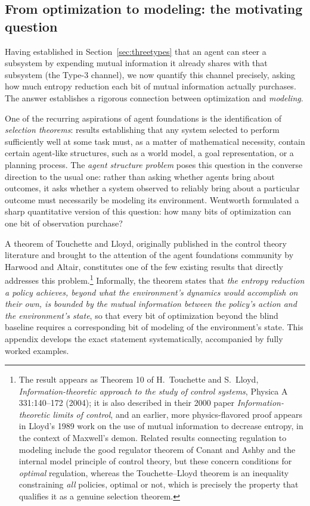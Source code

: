 \documentclass[10pt]{article}
\theoremstyle{definition}
\theoremstyle{remark}
\begin{document}
\subsection{From optimization to modeling: the motivating question}
\label{sec:tlquestion}

Having established in Section~\ref{sec:threetypes} that an agent can steer a subsystem by expending mutual information it already shares with that subsystem (the Type-3 channel), we now quantify this channel precisely, asking how much entropy reduction each bit of mutual information actually purchases. The answer establishes a rigorous connection between optimization and \emph{modeling}.

One of the recurring aspirations of agent foundations is the identification of \emph{selection theorems}: results establishing that any system selected to perform sufficiently well at some task must, as a matter of mathematical necessity, contain certain agent-like structures, such as a world model, a goal representation, or a planning process. The \emph{agent structure problem} poses this question in the converse direction to the usual one: rather than asking whether agents bring about outcomes, it asks whether a system observed to reliably bring about a particular outcome must necessarily be modeling its environment. Wentworth formulated a sharp quantitative version of this question: how many bits of optimization can one bit of observation purchase?

A theorem of Touchette and Lloyd, originally published in the control theory literature and brought to the attention of the agent foundations community by Harwood and Altair, constitutes one of the few existing results that directly addresses this problem.\footnote{The result appears as Theorem 10 of H.~Touchette and S.~Lloyd, \emph{Information-theoretic approach to the study of control systems}, Physica A 331:140--172 (2004); it is also described in their 2000 paper \emph{Information-theoretic limits of control}, and an earlier, more physics-flavored proof appears in Lloyd's 1989 work on the use of mutual information to decrease entropy, in the context of Maxwell's demon. Related results connecting regulation to modeling include the good regulator theorem of Conant and Ashby and the internal model principle of control theory, but these concern conditions for \emph{optimal} regulation, whereas the Touchette--Lloyd theorem is an inequality constraining \emph{all} policies, optimal or not, which is precisely the property that qualifies it as a genuine selection theorem.} Informally, the theorem states that \emph{the entropy reduction a policy achieves, beyond what the environment's dynamics would accomplish on their own, is bounded by the mutual information between the policy's action and the environment's state}, so that every bit of optimization beyond the blind baseline requires a corresponding bit of modeling of the environment's state. This appendix develops the exact statement systematically, accompanied by fully worked examples.
\end{document}
